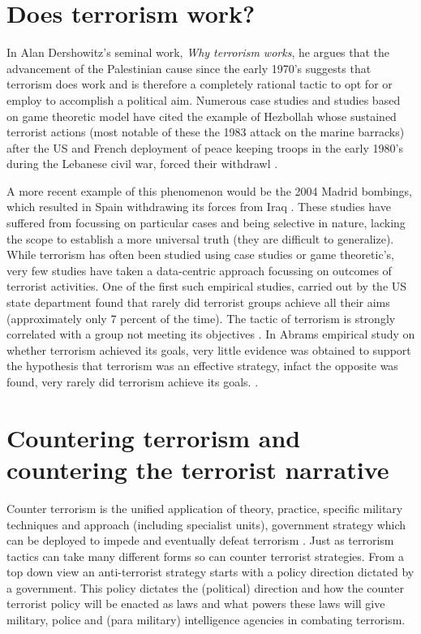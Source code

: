 \section{Does terrorism work?}
In Alan Dershowitz's seminal work, \textit{Why terrorism works}, he argues that the advancement of the Palestinian cause since the early 1970's \citep{dershowitz2002terrorism} suggests that terrorism does work and is therefore a completely rational tactic to opt for or employ to accomplish a political aim.  Numerous case studies and studies based on game theoretic model have cited the example of Hezbollah whose sustained terrorist actions (most notable of these the 1983 attack on the marine barracks) after the US and French deployment of peace keeping troops in the early 1980's during the Lebanese civil war, forced their withdrawl \citep{atran2004trends}. 

A more recent example of this phenomenon would be the 2004 Madrid bombings, which resulted in Spain withdrawing its forces from Iraq \citep{rose2007does}. These studies have suffered from focussing on particular cases and being selective in nature, lacking the scope to establish a more universal truth (they are difficult to generalize).
\\
While terrorism has often been studied using case studies or game theoretic's, very few studies have taken a data-centric approach focussing on outcomes of terrorist activities. One of the first such empirical studies, carried out by the US state department found that rarely did terrorist groups achieve all their aims (approximately only 7 percent of the time). The tactic of terrorism is strongly correlated with a group not meeting its objectives \citep{cronin2004foreign}. In Abrams empirical study on whether terrorism achieved its goals, very little evidence was obtained to support the hypothesis that terrorism was an effective strategy, infact the opposite was found, very rarely did terrorism achieve its goals. \citep{abrahms2006terrorism}.

\section{Countering terrorism and countering the terrorist narrative}

Counter terrorism is the unified application of theory, practice, specific military techniques and approach (including specialist units), government strategy which can be deployed to impede and eventually defeat terrorism \citep{jackson2005writing}. Just as terrorism tactics can take many different forms so can counter terrorist strategies. From a top down view an anti-terrorist strategy starts with a policy direction dictated by a government. This policy dictates the (political) direction and how the counter terrorist policy will be enacted as laws and what powers these laws will give military, police and (para military) intelligence agencies in combating terrorism. 

